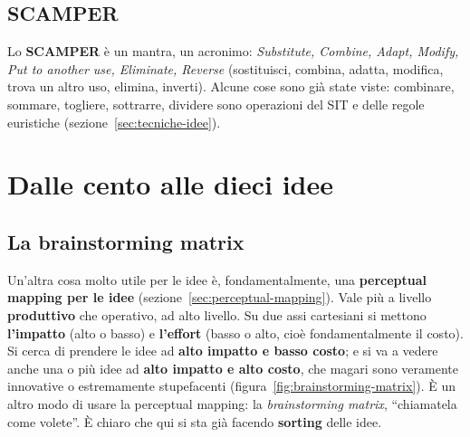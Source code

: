 \subsection{SCAMPER}

Lo \textbf{SCAMPER} è un mantra, un acronimo: \emph{Substitute, Combine,
Adapt, Modify, Put to another use, Eliminate, Reverse} (sostituisci,
combina, adatta, modifica, trova un altro uso, elimina, inverti). Alcune
cose sono già state viste: combinare, sommare, togliere, sottrarre,
dividere sono operazioni del SIT e delle regole euristiche
(sezione~\ref{sec:tecniche-idee}).

\section{Dalle cento alle dieci idee}
\label{sec:sortare-idee}



\subsection{La brainstorming matrix}

Un'altra cosa molto utile per le idee è, fondamentalmente, una
\textbf{perceptual mapping per le idee} (sezione~\ref{sec:perceptual-mapping}).
Vale più a livello \textbf{produttivo} che operativo, ad alto livello. Su due
assi cartesiani si mettono \textbf{l'impatto} (alto o basso) e
\textbf{l'effort} (basso o alto, cioè fondamentalmente il costo). Si cerca di
prendere le idee ad \textbf{alto impatto e basso costo}; e si va a vedere
anche una o più idee ad \textbf{alto impatto e alto costo}, che magari sono
veramente innovative o estremamente stupefacenti
(figura~\ref{fig:brainstorming-matrix}). È un altro modo di usare la
perceptual mapping: la \emph{brainstorming matrix}, ``chiamatela come
volete''. È chiaro che qui si sta già facendo \textbf{sorting} delle idee.

